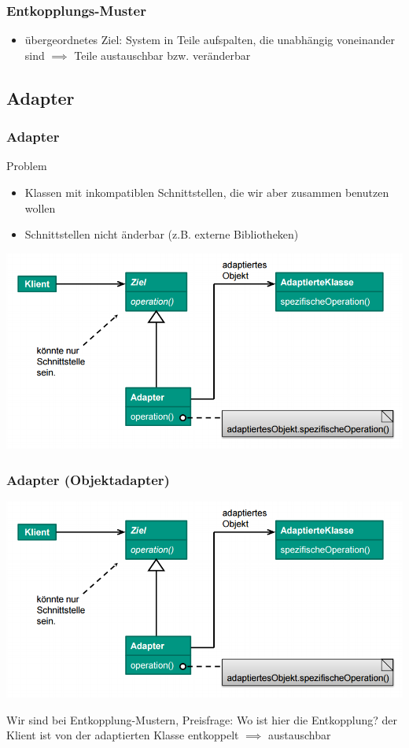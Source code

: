 \documentclass[18pt]{beamer}
\begin{document}
	\begin{frame}
		\frametitle{Entkopplungs-Muster}
		\begin{itemize}
			\item übergeordnetes Ziel: System in Teile aufspalten, die unabhängig voneinander sind
			\linebreak $\implies$ Teile austauschbar bzw. veränderbar
	\end{itemize}
	\end{frame}

	\subsection{Adapter}
	\begin{frame}
		\frametitle{Adapter}
		\begin{block}{Problem}
			\begin{itemize}
				\item Klassen mit inkompatiblen Schnittstellen, die wir aber zusammen benutzen wollen 
				\item Schnittstellen nicht änderbar (z.B. externe Bibliotheken)
			\end{itemize}
		\end{block}
		\pause
		\includegraphics[scale=0.45]{./pics/tut3/adap-obj.png}
	\end{frame}

	\begin{frame}
		\frametitle{Adapter (Objektadapter)}
		\includegraphics[scale=0.45]{./pics/tut3/adap-obj.png}
		\begin{block}{Wir sind bei Entkopplung-Mustern, Preisfrage:}
			Wo ist hier die Entkopplung?
			\pause
			\linebreak der Klient ist von der adaptierten Klasse entkoppelt $\implies$ austauschbar
		\end{block}
	\end{frame}
\end{document}
